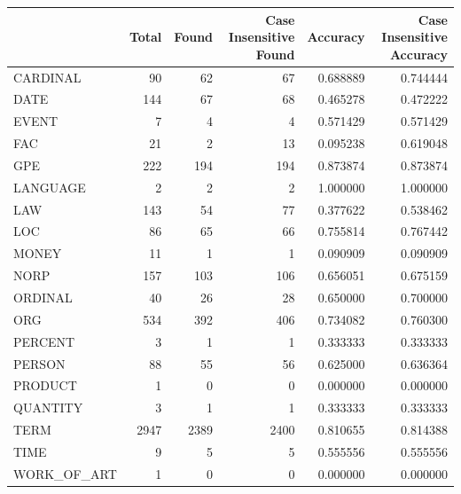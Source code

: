 \begin{tabular}{lrrrrr}
\toprule
 & Total & Found & Case Insensitive Found & Accuracy & Case Insensitive Accuracy \\
\midrule
CARDINAL & 90 & 62 & 67 & 0.688889 & 0.744444 \\
DATE & 144 & 67 & 68 & 0.465278 & 0.472222 \\
EVENT & 7 & 4 & 4 & 0.571429 & 0.571429 \\
FAC & 21 & 2 & 13 & 0.095238 & 0.619048 \\
GPE & 222 & 194 & 194 & 0.873874 & 0.873874 \\
LANGUAGE & 2 & 2 & 2 & 1.000000 & 1.000000 \\
LAW & 143 & 54 & 77 & 0.377622 & 0.538462 \\
LOC & 86 & 65 & 66 & 0.755814 & 0.767442 \\
MONEY & 11 & 1 & 1 & 0.090909 & 0.090909 \\
NORP & 157 & 103 & 106 & 0.656051 & 0.675159 \\
ORDINAL & 40 & 26 & 28 & 0.650000 & 0.700000 \\
ORG & 534 & 392 & 406 & 0.734082 & 0.760300 \\
PERCENT & 3 & 1 & 1 & 0.333333 & 0.333333 \\
PERSON & 88 & 55 & 56 & 0.625000 & 0.636364 \\
PRODUCT & 1 & 0 & 0 & 0.000000 & 0.000000 \\
QUANTITY & 3 & 1 & 1 & 0.333333 & 0.333333 \\
TERM & 2947 & 2389 & 2400 & 0.810655 & 0.814388 \\
TIME & 9 & 5 & 5 & 0.555556 & 0.555556 \\
WORK_OF_ART & 1 & 0 & 0 & 0.000000 & 0.000000 \\
\bottomrule
\end{tabular}
